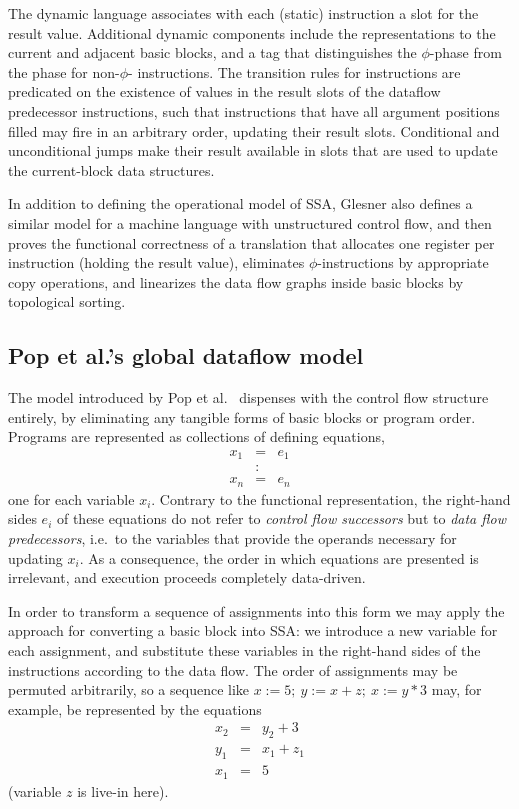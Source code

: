 The dynamic language associates with each (static) instruction a slot
for the result value. Additional dynamic components include the
representations to the current and adjacent basic blocks, and a tag
that distinguishes the $\phi$-phase from the phase for non-$\phi$-
instructions. The transition rules for instructions are predicated on
the existence of values in the result slots of the dataflow
predecessor instructions, such that instructions that have all
argument positions filled may fire in an arbitrary order, updating
their result slots. Conditional and unconditional jumps make their
result available in slots that are used to update the current-block
data structures.

In addition to defining the operational model of SSA, Glesner also
defines a similar model for a machine language with unstructured
control flow, and then proves the functional correctness of a
translation that allocates one register per instruction (holding the
result value), eliminates $\phi$-instructions by appropriate copy
operations, and linearizes the data flow graphs inside basic blocks by
topological sorting. 

\subsection{Pop et al.'s global dataflow model}
\label{section:Part1:Semantics:PopSemantics}
The model introduced by Pop et al.~\cite{PopJS2007} dispenses with the
control flow structure entirely, by eliminating any tangible forms of
basic blocks or program order. Programs are represented as collections
of defining equations,
\begin{eqnarray*}
x_1 & = & e_1\\
& : &\\
x_n & = & e_n
\end{eqnarray*}
one for each variable $x_i$. Contrary to the functional
representation, the right-hand sides $e_i$ of these equations do not
refer to \emph{control flow successors} but to \emph{data flow
predecessors}, i.e.~to the variables that provide the operands
necessary for updating $x_i$. As a consequence, the order in which
equations are presented is irrelevant, and execution proceeds
completely data-driven.

In order to transform a sequence of assignments into this form we may
apply the approach for converting a basic block into SSA: we introduce
a new variable for each assignment, and substitute these variables in
the right-hand sides of the instructions according to the data
flow. The order of assignments may be permuted arbitrarily, so a
sequence like $x := 5;\ y:=x+z;\ x:=y*3$ may, for example, be
represented by the equations
\begin{eqnarray*}
x_2 & = & y_2 + 3\\
y_1 & = & x_1 + z_1\\
x_1 & = & 5
\end{eqnarray*}
(variable $z$ is live-in here).

